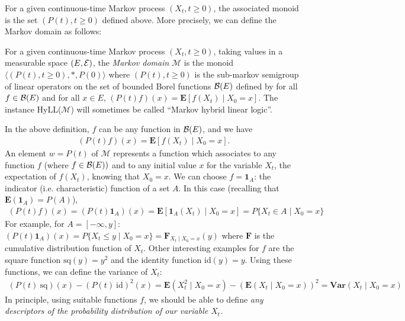\documentclass{article}
\begin{document}
For a given continuous-time Markov process $(X_t,t\geq 0)$, the associated monoid is the 
set $(P(t),t\geq 0)$ defined above. More precisely, we can define the Markov domain as follows:
  
\begin{defn}
\label{defn:markov}
  For a given continuous-time Markov process $(X_t,t\geq 0)$,  taking values in a 
  measurable space $(E,{\cal E})$, the \emph{Markov domain} $\mathcal{M}$ is
  the monoid $\langle (P(t),t\geq 0), \ast, P(0) \rangle$ where 
  $(P(t),t\geq 0)$ is the sub-markov semigroup of linear operators on the set of bounded
  Borel functions ${\cal B}(E)$ defined by for all $f\in{\cal B}(E)$ and for all $x\in E$,
  $(P(t)f)(x)=\mathbf{E}[f(X_t)\mid X_0=x]$.
  The instance HyLL($\mathcal{M}$) will sometimes be called 
  ``Markov hybrid linear logic''.
\end{defn}

In the above definition, $f$ can be any function in ${\cal B}(E)$, and we have
\begin{gather*}
(P(t)f)(x) = {\mathbf E}[f(X_t)\mid X_0=x].
\end{gather*}
An element $w= P(t)$ of $\mathcal{M}$ represents a function which
associates to any function $f$ (where $f \in{\cal B}(E))$ and to any initial
value $x$ for the variable $X_t$, the expectation of $f(X_t)$, knowing that $X_0=x$.
We can choose $f = {\mathbf 1}_A$: the indicator (i.e. characteristic) function of a set $A$.
In this case (recalling that ${\mathbf E}({\mathbf 1}_A) = P(A)$),
\begin{gather*}
(P(t)f)(x) = (P(t){\mathbf 1}_A)(x)
= {\mathbf E}[{\mathbf 1}_A(X_t)\mid X_0=x]
= P\{X_t \in A \mid X_0=x\}
\end{gather*}
For example, for $A=[- \infty, y]$:
$(P(t) {\mathbf 1}_A)(x) = P \{X_t \le y \mid X_0=x\} = {\mathbf F}_{X_t \mid X_0=x}(y)$
where ${\mathbf F}$ is the cumulative distribution function of $X_t$.
Other interesting examples for $f$ are the square function $\text{sq}(y) = y^2$
and the identity function $\text{id}(y) = y$. Using these functions, we can
define the variance of $X_t$:
\begin{gather*}
(P(t)~ \text{sq})(x) - (P(t)~ \text{id})^2(x) = {\mathbf E}(X_t^2 \mid X_0=x) -
({\mathbf E}(X_t \mid X_0=x))^2
  = \mathbf{Var} (X_t \mid X_0=x)
\end{gather*}
In principle, using suitable functions $f$, we should be able to define
\emph{any descriptors of the probability distribution of our variable $X_t$.}
\end{document}
